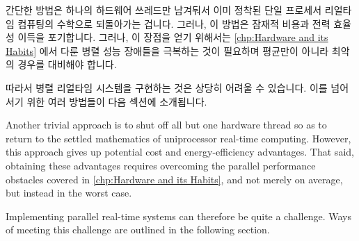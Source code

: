간단한 방법은 하나의 하드웨어 쓰레드만 남겨둬서 이미 정착된 단일 프로세서
리얼타임 컴퓨팅의 수학으로 되돌아가는 겁니다.
그러나, 이 방법은 잠재적 비용과 전력 효율성 이득을 포기합니다.
그러나, 이 장점을 얻기 위해서는
\cref{chp:Hardware and its Habits} 에서 다룬 병렬 성능 장애들을 극복하는 것이
필요하며 평균만이 아니라 최악의 경우를 대비해야 합니다.

따라서 병렬 리얼타임 시스템을 구현하는 것은 상당히 어려울 수 있습니다.
이를 넘어서기 위한 여러 방법들이 다음 섹션에 소개됩니다.

\iffalse

Another trivial approach is to shut off all but one hardware thread so as
to return to the settled mathematics of uniprocessor real-time
computing.
However, this approach gives up potential cost and energy-efficiency
advantages.
That said, obtaining these advantages requires overcoming the parallel
performance obstacles covered in
\cref{chp:Hardware and its Habits},
and not merely on average, but instead in the worst case.

Implementing parallel real-time systems can therefore be quite a
challenge.
Ways of meeting this challenge are outlined in the following section.

